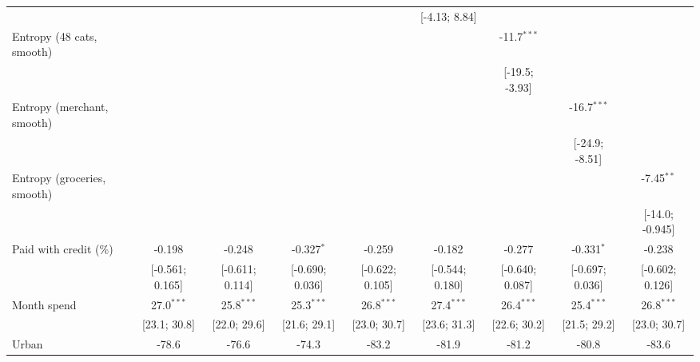 \begin{table}[htbp]
\begin{threeparttable}[b]
\begin{tabular}{lcccccccc}
                                     &                 &                 &                 &                 & [-4.13; 8.84]   &                 &                 &   \\   
         Entropy (48 cats, smooth)   &                 &                 &                 &                 &                 & -11.7$^{***}$   &                 &   \\   
                                     &                 &                 &                 &                 &                 & [-19.5; -3.93]  &                 &   \\   
         Entropy (merchant, smooth)  &                 &                 &                 &                 &                 &                 & -16.7$^{***}$   &   \\   
                                     &                 &                 &                 &                 &                 &                 & [-24.9; -8.51]  &   \\   
         Entropy (groceries, smooth) &                 &                 &                 &                 &                 &                 &                 & -7.45$^{**}$\\   
                                     &                 &                 &                 &                 &                 &                 &                 & [-14.0; -0.945]\\   
         Paid with credit (\%)       & -0.198          & -0.248          & -0.327$^{*}$    & -0.259          & -0.182          & -0.277          & -0.331$^{*}$    & -0.238\\   
                                     & [-0.561; 0.165] & [-0.611; 0.114] & [-0.690; 0.036] & [-0.622; 0.105] & [-0.544; 0.180] & [-0.640; 0.087] & [-0.697; 0.036] & [-0.602; 0.126]\\   
         Month spend                 & 27.0$^{***}$    & 25.8$^{***}$    & 25.3$^{***}$    & 26.8$^{***}$    & 27.4$^{***}$    & 26.4$^{***}$    & 25.4$^{***}$    & 26.8$^{***}$\\   
                                     & [23.1; 30.8]    & [22.0; 29.6]    & [21.6; 29.1]    & [23.0; 30.7]    & [23.6; 31.3]    & [22.6; 30.2]    & [21.5; 29.2]    & [23.0; 30.7]\\   
         Urban                       & -78.6           & -76.6           & -74.3           & -83.2           & -81.9           & -81.2           & -80.8           & -83.6\\   

\end{tabular}
\end{threeparttable}
\end{table}
